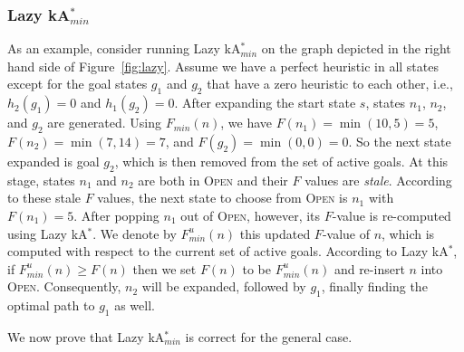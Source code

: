 \documentclass{aicom2e}
\newcommand{\kastar}{kA$^*$}
\newcommand{\kastarmin}{kA$^*_{min}$}
\newcommand{\minf}{$F_{min}(n)$}
\newcommand{\open}{\textsc{Open}}
\begin{document}
\subsubsection{Lazy \kastarmin{}}

As an example, consider running Lazy \kastarmin{} on the graph depicted in the
right hand side of Figure~\ref{fig:lazy}. Assume we have a perfect heuristic in
all states except for the goal states $g_1$ and $g_2$ that have a zero
heuristic to each other, i.e., $h_2(g_1)=0$ and $h_1(g_2)=0$. After expanding
the start state $s$, states $n_1$, $n_2$, and $g_2$ are generated. Using
\minf{}, we have $F(n_1)=\min(10,5)=5$, $F(n_2)=\min(7,14)=7$, and
$F(g_2)=\min(0,0)=0$. So the next state expanded is goal $g_2$, which is then
removed from the set of active goals. At this stage, states $n_1$ and $n_2$ are
both in \open{} and their $F$ values are {\em stale}.
According to these stale $F$ values, the next state to
choose from \open{} is $n_1$ with $F(n_1)=5$. After popping $n_1$ out of
\open{}, however, its $F$-value is re-computed using Lazy \kastar{}. We denote
by $F^u_{min}(n)$ this updated $F$-value of $n$, which is computed with respect
to the current set of active goals. According to Lazy \kastar{}, if
$F^u_{min}(n)\geq F(n)$ then we set $F(n)$ to be $F^u_{min}(n)$ and re-insert
$n$ into \open{}. Consequently, $n_2$ will be expanded, followed by $g_1$,
finally finding the optimal path to $g_1$ as well.

We now prove that Lazy \kastarmin{} is correct for the general case.
\end{document}

